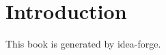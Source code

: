 \documentclass[11pt]{book}
\begin{document}
\tableofcontents
\chapter{Introduction}
This book is generated by idea-forge.
\end{document}
